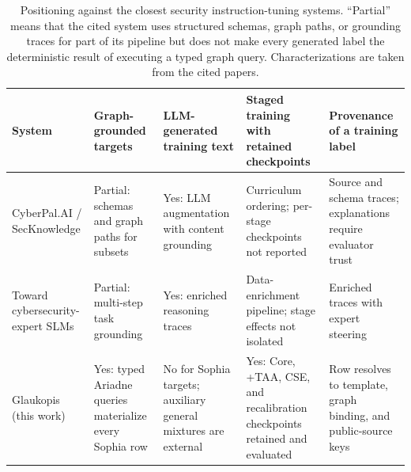\documentclass[twocolumn]{svjour3}
\begin{document}
\begin{table}
\centering\footnotesize
\caption{Positioning against the closest security instruction-tuning systems. ``Partial'' means that the cited system uses structured schemas, graph paths, or grounding traces for part of its pipeline but does not make every generated label the deterministic result of executing a typed graph query. Characterizations are taken from the cited papers.}\label{tab:positioning}
\begin{tabularx}{\textwidth}{@{}p{2.6cm}XXXX@{}}
\toprule
System & Graph-grounded targets & LLM-generated training text & Staged training with retained checkpoints & Provenance of a training label \\
\midrule
CyberPal.AI / SecKnowledge \cite{levi2025cyberpal} & Partial: schemas and graph paths for subsets & Yes: LLM augmentation with content grounding & Curriculum ordering; per-stage checkpoints not reported & Source and schema traces; explanations require evaluator trust \\
Toward cybersecurity-expert SLMs \cite{levi2025toward} & Partial: multi-step task grounding & Yes: enriched reasoning traces & Data-enrichment pipeline; stage effects not isolated & Enriched traces with expert steering \\
Glaukopis (this work) & Yes: typed Ariadne queries materialize every Sophia row & No for Sophia targets; auxiliary general mixtures are external & Yes: Core, +TAA, CSE, and recalibration checkpoints retained and evaluated & Row resolves to template, graph binding, and public-source keys \\
\bottomrule
\end{tabularx}
\end{table}
\end{document}
